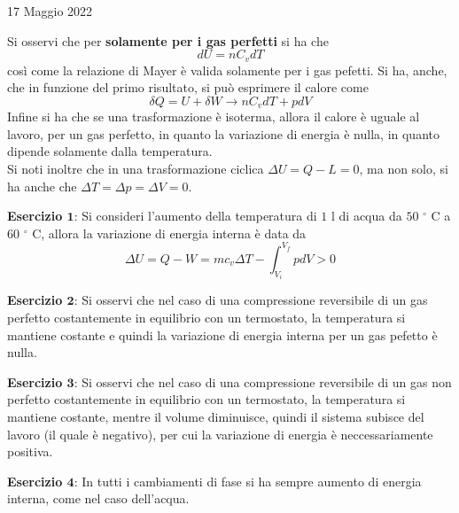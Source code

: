 \documentclass[a4paper]{extarticle}
\begin{document}
\newpage
\noindent
\begin{center}
  17 Maggio 2022
\end{center}
Si osservi che per \textbf{solamente per i gas perfetti} si ha che
\[dU = n C_v dT\]
così come la relazione di Mayer è valida solamente per i gas pefetti. Si ha, anche, che in funzione del primo risultato, si può esprimere il calore come
\[\delta Q = U + \delta W \longrightarrow n C_v dT + p dV\]
Infine si ha che se una trasformazione è isoterma, allora il calore è uguale al lavoro, per un gas perfetto, in quanto la variazione di energia è nulla, in quanto dipende solamente dalla temperatura.\\
Si noti inoltre che in una trasformazione ciclica $\Delta U = Q - L = 0$, ma non solo, si ha anche che $\Delta T = \Delta p = \Delta V = 0$.

\vspace{1em}
\noindent
\textbf{Esercizio $\boldsymbol{1}$}: Si consideri l'aumento della temperatura di $1$ l di acqua da $50$ $^\circ$ C a $60$ $^\circ$ C, allora la variazione di energia interna è data da
\[\Delta U = Q - W = m c_v \Delta T - \int_{V_i}^{V_f} p dV > 0\]

\vspace{1em}
\noindent
\textbf{Esercizio $\boldsymbol{2}$}: Si osservi che nel caso di una compressione reversibile di un gas perfetto costantemente in equilibrio con un termostato, la temperatura si mantiene costante e quindi la variazione di energia interna per un gas pefetto è nulla.

\vspace{1em}
\noindent
\textbf{Esercizio $\boldsymbol{3}$}: Si osservi che nel caso di una compressione reversibile di un gas non perfetto costantemente in equilibrio con un termostato, la temperatura si mantiene costante, mentre il volume diminuisce, quindi il sistema subisce del lavoro (il quale è negativo), per cui la variazione di energia è neccessariamente positiva.

\vspace{1em}
\noindent
\textbf{Esercizio $\boldsymbol{4}$}: In tutti i cambiamenti di fase si ha sempre aumento di energia interna, come nel caso dell'acqua.

\vspace{1em}
\end{document}
